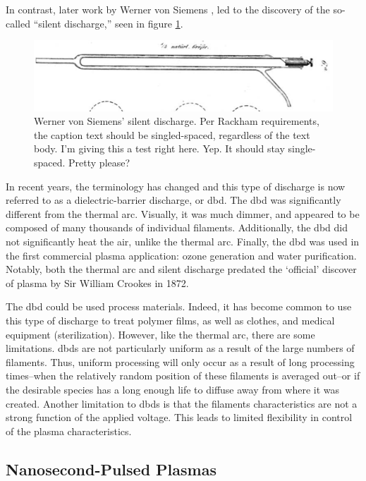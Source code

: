 In contrast, later work by Werner von Siemens \cite{Siemens1857}, led to the
discovery of the so-called ``silent discharge,'' seen in figure
\ref{fig:siemens}.
\begin{figure}\label{fig:siemens}
  \centering
  \includegraphics[scale=0.5]{chapters/introduction/figures/siemens.png}
  \caption{Werner von Siemens' silent discharge. Per Rackham requirements, the
caption text should be singled-spaced, regardless of the text body. I'm giving
this a test right here. Yep. It should stay single-spaced. Pretty please?}
\end{figure}
In recent years, the terminology has changed and this type of
discharge is now referred to as a dielectric-barrier discharge, or \acs{dbd}.
The \acs{dbd} was significantly different from the thermal arc. Visually, it was
much dimmer, and appeared to be composed of many thousands of individual
filaments. Additionally, the \acs{dbd} did not significantly heat the air,
unlike the thermal arc. Finally, the \acs{dbd} was used in the first commercial
plasma application: ozone generation and water purification. Notably, both the
thermal arc and silent discharge predated the `official' discover of plasma by
Sir William Crookes in 1872.

The \acs{dbd} could be used process materials. Indeed, it has become common to
use this type of discharge to treat polymer films, as well as clothes, and
medical equipment (sterilization). However, like the thermal arc, there are some
limitations. \acs{dbd}s are not particularly uniform as a result of the large
numbers of filaments. Thus, uniform processing will only occur as a result of
long processing times--when the relatively random position of these filaments is
averaged out--or if the desirable species has a long enough life to diffuse away
from where it was created. Another limitation to \acs{dbd}s is that the
filaments characteristics are not a strong function of the applied voltage. This
leads to limited flexibility in control of the plasma characteristics.

\subsection{Nanosecond-Pulsed Plasmas}

